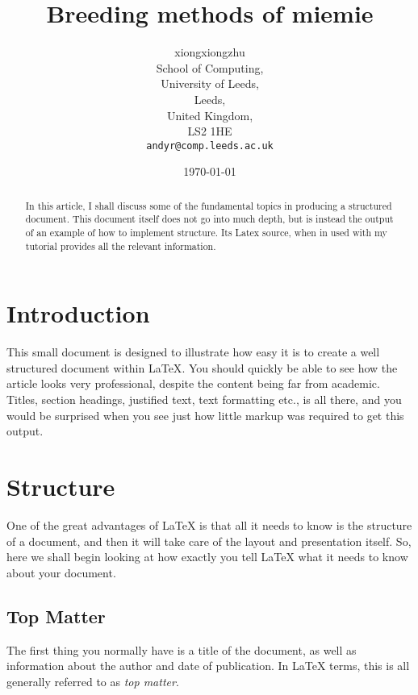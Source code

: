 \documentclass{article}
\begin{document}
	
	\title{Breeding methods of miemie} %
	\author{xiongxiongzhu\\
		School of Computing,\\
		University of Leeds,\\
		Leeds,\\
		United Kingdom,\\
		LS2 1HE\\
		\texttt{andyr@comp.leeds.ac.uk}}  %
	\date{\today}  %
	\maketitle
	
	\begin{abstract}
		In this article, I shall discuss some of the fundamental topics in
		producing a structured document.  This document itself does not go into
		much depth, but is instead the output of an example of how to implement
		structure. Its Latex source, when in used with my tutorial
		provides all the relevant information.  \end{abstract}
	
	\section{Introduction}
	This small document is designed to illustrate how easy it is to create a
	well structured document within \LaTeX\cite{lamport94}.  You should quickly be able to
	see how the article looks very professional, despite the content being
	far from academic.  Titles, section headings, justified text, text
	formatting etc., is all there, and you would be surprised when you see
	just how little markup was required to get this output.
	
	\section{Structure}
	One of the great advantages of \LaTeX{} is that all it needs to know is
	the structure of a document, and then it will take care of the layout
	and presentation itself.  So, here we shall begin looking at how exactly
	you tell \LaTeX{} what it needs to know about your document.
	
	\subsection{Top Matter}
	The first thing you normally have is a title of the document, as well as
	information about the author and date of publication.  In \LaTeX{} terms,
	this is all generally referred to as \emph{top matter}.
	
\end{document}
